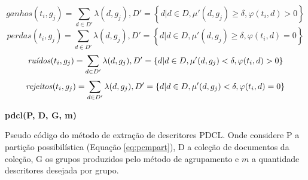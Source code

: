 \begin{equation}
  ganhos(t_i,g_j) = 
  \sum_{
      d \in D' 
  } \lambda(d,g_j), D' = \left\{d | d \in D, \mu'(d,g_j) \geq \delta, \varphi(t_i,d) > 0
  \right\}
  \label{eq:ganhos2}
\end{equation}
\begin{equation}
  perdas(t_i,g_j) = 
  \sum_{
      d \in D' 
  } \lambda(d,g_j), D' = \left\{d | d \in D, \mu'(d,g_j) \geq \delta, \varphi(t_i,d) = 0
  \right\}
  \label{eq:perdas2}
\end{equation}
\begin{equation}
  \text{\it ruídos\/}(t_i,g_j) = 
  \sum_{
      d \in D' 
  } \lambda(d,g_j), D' = \left\{d | d \in D, \mu'(d,g_j) < \delta, \varphi(t_i,d) > 0 \right\}
  \label{eq:ruidos2}
\end{equation}
\begin{equation}
  \text{\it rejeitos\/}(t_i,g_j) = 
  \sum_{
      d \in D' 
  } \lambda(d,g_j), D' = \left\{d | d \in D, \mu'(d,g_j) < \delta, \varphi(t_i,d) = 0 \right\}
  \label{eq:rejeitos2}
\end{equation}

\begin{algorithm}[H] 
  \SetAlgoLined 
  \textbf{{\color{blue}pdcl}(P, D, G, m)}\\
  \caption{Pseudo código do método de extração de descritores PDCL. Onde
    considere P a partição
  possibilística (Equação \ref{eq:pcmpart}), D a coleção de documentos da coleção, G os grupos
produzidos pelo método de agrupamento e $m$ a quantidade descritores desejada por grupo.}
\label{alg:pdcl} 
\end{algorithm}

